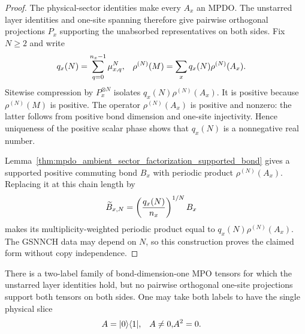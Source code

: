 \begin{proof}
    \leanok
    The physical-sector identities make every $A_x$ an MPDO.  The unstarred
    layer identities and one-site spanning therefore give pairwise orthogonal
    projections $P_x$ supporting the unabsorbed representatives on both sides.
    Fix $N\geq2$ and write
    \begin{align}
        q_x(N)        & =\sum_{q=0}^{n_x-1}\mu_{x,q}^{N},
                      &
        \rho^{(N)}(M) & =\sum_x q_x(N)\rho^{(N)}(A_x).
        \notag
    \end{align}
    Sitewise compression by $P_x^{\otimes N}$ isolates
    $q_x(N)\rho^{(N)}(A_x)$.  It is positive because $\rho^{(N)}(M)$ is
    positive.  The operator $\rho^{(N)}(A_x)$ is positive and nonzero: the
    latter follows from positive bond dimension and one-site injectivity.
    Hence uniqueness of the positive scalar phase shows that $q_x(N)$ is a
    nonnegative real number.

    Lemma~\ref{thm:mpdo_ambient_sector_factorization_supported_bond} gives
    a supported positive commuting bond $B_x$ with periodic product
    $\rho^{(N)}(A_x)$.  Replacing it at this chain length by
    \begin{align}
        \widetilde B_{x,N}
         & =\left(\frac{q_x(N)}{n_x}\right)^{1/N}B_x
        \notag
    \end{align}
    makes its multiplicity-weighted periodic product equal to
    $q_x(N)\rho^{(N)}(A_x)$.  The GSNNCH data may depend on $N$, so this
    construction proves the claimed form without copy independence.
\end{proof}

\begin{lemma}
    \label{thm:mpdo_bnt_layer_square_zero_obstruction}
    \leanok
    There is a two-label family of bond-dimension-one MPO tensors for which
    the unstarred layer identities hold, but no pairwise orthogonal one-site
    projections support both tensors on both sides. One may take both labels
    to have the single physical slice
    \begin{align}
        A & =|0\rangle\langle1|,
          & A\ne0,
          & A^2=0.
        \notag
    \end{align}
\end{lemma}

